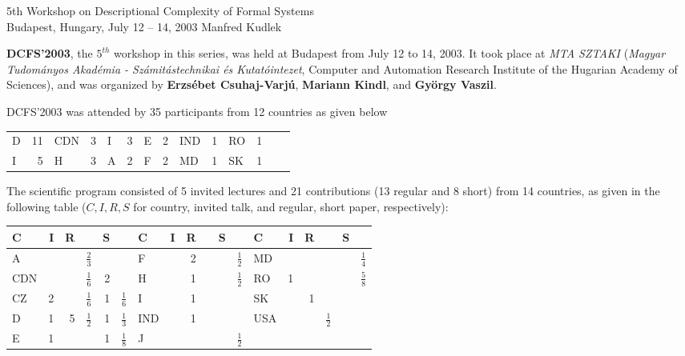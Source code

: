 \documentclass[final]{beatcs}
\begin{document}
  {5th Workshop on Descriptional Complexity of Formal Systems\\
   Budapest, Hungary, July 12 -- 14, 2003}
  {Manfred Kudlek} 

{\bf DCFS'2003}, the ${5}^{th}$ workshop in this series, was held at
{Budapest} from July 12 to 14, 2003.
It took place at {\it MTA SZTAKI}
({\it Magyar Tudom\'{a}nyos Akad\'{e}mia - Sz\'{a}mit\'{a}stechnikai
 \'{e}s Kutat\'{o}intezet}, {Computer and Automation Research
 Institute of the Hugarian Academy of Sciences}),
 and was organized by {\bf Erzs\'{e}bet Csuhaj-Varj\'{u}}, 
 {\bf Mariann Kindl}, and {\bf Gy\"{o}rgy Vaszil}.

\medskip

{DCFS'2003} was attended by 35 participants from 12 countries as given
below
\begin{center}
\begin{tabular}{|lr|lr|lr|lr|lr|lr|lr|}
\hline
D & 11 & CDN & 3 & I & 3 & E & 2 & IND & 1 & RO & 1 \\
I & 5 & H & 3 & A & 2 & F & 2 & MD & 1 & SK & 1 \\
\hline
\end{tabular}
\end{center}

 The scientific program consisted of 5 invited lectures and 21
 contributions (13 regular and 8 short) from 14 countries, as given in
 the following table ($C,I,R,S$ for country, invited talk, and
 regular, short paper, respectively): 
\begin{center}
\begin{tabular}{||l|r|rc|rc||l|r|rc|rc||l|r|rc|rc||}
\hline
C & I & R & & S & & C & I & R & & S & & C & I & R & & S & \\
\hline
A & & & $\frac{2}{3}$ & & & F & & 2 & & & $\frac{1}{2}$ &
 MD & & & & & $\frac{1}{4}$ \\[1pt]
CDN & & & $\frac{1}{6}$ & 2 & & H & & 1 & & & $\frac{1}{2}$ &
 RO & 1 & & & & $\frac{5}{8}$ \\[1pt]
CZ & 2 & & $\frac{1}{6}$ & 1 & $\frac{1}{6}$ & I & & 1 & & & &
 SK & & 1 & & & \\[1pt]
D & 1 & 5 & $\frac{1}{2}$ & 1 & $\frac{1}{3}$ & IND & & 1 & & & &
 USA & & & $\frac{1}{2}$ & & \\[1pt]
E & 1 & & & 1 & $\frac{1}{8}$ & J & & & & & $\frac{1}{2}$ &
 & & & & & \\[1pt]
\hline
\end{tabular}
\end{center}
\end{document}
